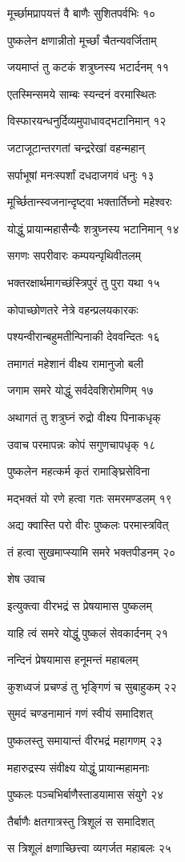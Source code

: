 मूर्च्छामप्रापयत्तं वै बाणैः सुशितपर्वभिः १०

पुष्कलेन क्षणान्नीतो मूर्च्छां चैतन्यवर्जिताम्

जयमाप्तं तु कटकं शत्रुघ्नस्य भटार्दनम् ११

एतस्मिन्समये साम्बः स्यन्दनं वरमास्थितः

विस्फारयन्धनुर्दिव्यमुपाधावद्भटानिमान् १२

जटाजूटान्तरगतां चन्द्ररेखां वहन्महान्

सर्पाभूषां मनःस्पर्शां दधदाजगवं धनुः १३

मूर्च्छितान्स्वजनान्दृष्ट्वा भक्तार्तिघ्नो महेश्वरः

योद्धुं प्रायान्महासैन्यैः शत्रुघ्नस्य भटानिमान् १४

सगणः सपरीवारः कम्पयन्पृथिवीतलम्

भक्तरक्षार्थमागच्छंस्त्रिपुरं तु पुरा यथा १५

कोपाच्छोणतरे नेत्रे वहन्प्रलयकारकः

पश्यन्वीरान्बहुमतीन्पिनाकी देववन्दितः १६

तमागतं महेशानं वीक्ष्य रामानुजो बली

जगाम समरे योद्धुं सर्वदेवशिरोमणिम् १७

अथागतं तु शत्रुघ्नं रुद्रो वीक्ष्य पिनाकधृक्

उवाच परमापन्नः कोपं सगुणचापधृक् १८

पुष्कलेन महत्कर्म कृतं रामाङ्घ्रिसेविना

मद्भक्तं यो रणे हत्वा गतः समरमण्डलम् १९

अद्य क्वास्ति परो वीरः पुष्कलः परमास्त्रवित्

तं हत्वा सुखमाप्स्यामि समरे भक्तपीडनम् २०

शेष उवाच

इत्युक्त्वा वीरभद्रं स प्रेषयामास पुष्कलम्

याहि त्वं समरे योद्धुं पुष्कलं सेवकार्दनम् २१

नन्दिनं प्रेषयामास हनूमन्तं महाबलम्

कुशध्वजं प्रचण्डं तु भृङ्गिणं च सुबाहुकम् २२

सुमदं चण्डनामानं गणं स्वीयं समादिशत्

पुष्कलस्तु समायान्तं वीरभद्रं महागणम् २३

महारुद्रस्य संवीक्ष्य योद्धुं प्रायान्महामनाः

पुष्कलः पञ्चभिर्बाणैस्ताडयामास संयुगे २४

तैर्बाणैः क्षतगात्रस्तु त्रिशूलं स समादिशत्

स त्रिशूलं क्षणाच्छित्त्वा व्यगर्जत महाबलः २५

